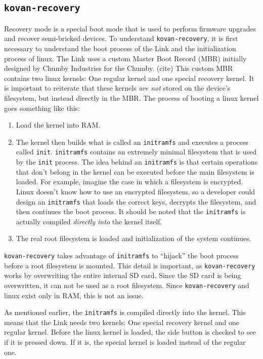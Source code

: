 \documentclass[12pt,letterpaper]{article}
\begin{document}
	\subsection{\texttt{kovan-recovery}}
	Recovery mode is a special boot mode that is used to perform firmware upgrades and recover semi-bricked devices.
	To understand  \texttt{kovan-recovery}, it is first necessary to understand the boot process of the Link and the initialization process of linux.
	The Link uses a custom Master Boot Record (MBR) initially designed by Chumby Industries for the Chumby. (cite) This custom MBR
	contains two linux kernels: One regular kernel and one special recovery kernel. It is important to reiterate that these kernels \emph{are not} 
	stored on the device's filesystem, but instead directly in the MBR. The process of booting a linux kernel goes something like this:
	\begin{enumerate}
		\item Load the kernel into RAM.
		\item The kernel then builds what is called an \texttt{initramfs} and executes a process called \texttt{init}. \texttt{initramfs} contains
		an extremely minimal filesystem that is used by the \texttt{init} process. The idea behind an \texttt{initramfs} is that certain operations
		that don't belong in the kernel can be executed before the main filesystem is loaded. For example, imagine the case in which a filesystem
		is encrypted. Linux doesn't know how to use an encrypted filesystem, so a developer could design an \texttt{initramfs} that loads the
		correct keys, decrypts the filesystem, and then continues the boot process. It should be noted that the \texttt{initramfs} is actually
		compiled \emph{directly into} the kernel itself.
		\item The real root filesystem is loaded and initialization of the system continues.
	\end{enumerate}
	
	\texttt{kovan-recovery} takes advantage of \texttt{initramfs} to ``hijack'' the boot process before a root filesystem is mounted. This detail is
	important, as \texttt{kovan-recovery} works by overwriting the entire internal SD card. Since the SD card is being overwritten, it can not be used
	as a root filesystem. Since \texttt{kovan-recovery} and linux exist only in RAM, this is not an issue.
	
	As mentioned earlier, the \texttt{initramfs} is compiled directly into the kernel. This means that the Link needs two kernels: One special
	recovery kernel and one regular kernel. Before the linux kernel is loaded, the side button is checked to see if it is pressed down. If it is,
	the special kernel is loaded instead of the regular one.
	
\end{document}
